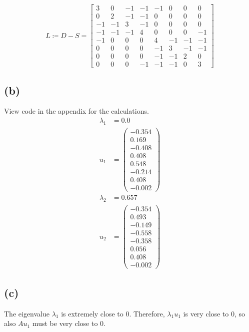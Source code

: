 \documentclass[12pt]{article}
\begin{document}
\begin{equation*}
	L \coloneqq D - S = \left[
	\begin{array}{cccccccc}
		3 & 0 & -1 & -1 & -1 & 0 & 0 & 0 \\
		0 & 2 & -1 & -1 & 0 & 0 & 0 & 0 \\
		-1 & -1 & 3 & -1 & 0 & 0 & 0 & 0 \\
		-1 & -1 & -1 & 4 & 0 & 0 & 0 & -1 \\
		-1 & 0 & 0 & 0 & 4 & -1 & -1 & -1 \\
		0 & 0 & 0 & 0 & -1 & 3 & -1 & -1 \\
		0 & 0 & 0 & 0 & -1 & -1 & 2 & 0 \\
		0 & 0 & 0 & -1 & -1 & -1 & 0 & 3
	\end{array} \right]
\end{equation*}

\subsection*{(b)}
View code in the appendix for the calculations. \\
\begin{align*}
	\lambda_1 &= 0.0 \\
	u_1 &= \left( \begin{array}{c}
		-0.354 \\ 0.169 \\ -0.408 \\ 0.408 \\ 0.548 \\ -0.214 \\ 0.408 \\ -0.002
	\end{array} \right) \\
	\lambda_2 &= 0.657 \\
	u_2 &= \left( \begin{array}{c}
		-0.354 \\ 0.493 \\ -0.149 \\ -0.558 \\ -0.358 \\ 0.056 \\ 0.408 \\ -0.002
	\end{array} \right)
\end{align*}

\subsection*{(c)}
The eigenvalue $\lambda_1$ is extremely close to 0. Therefore, $\lambda_1 u_1$ is very close to 0, so also $A u_1$ must be very close to 0.
\end{document}
